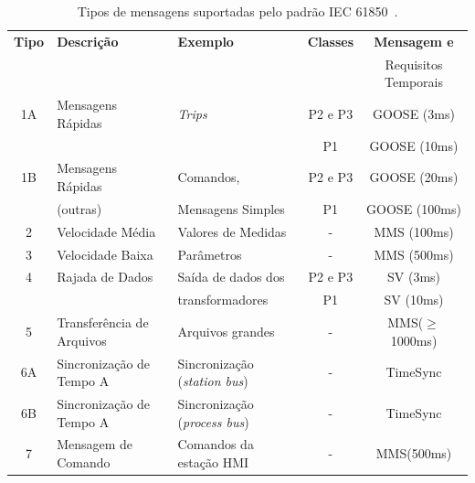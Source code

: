 \begin{table}[h!]	
	\begin{center}
		\caption{Tipos de mensagens suportadas pelo padrão IEC 61850~\cite{fangxing2010}.}	
		\begin{tabular}{|c|p{3.5cm}|p{4cm} |c|c|} \hline
		\label{tab:2_tabmsg}
{\bf Tipo} & {\bf Descrição} & {\bf Exemplo} & {\bf Classes} & {\bf Mensagem e }	\\
		   &			  &				  &	& Requisitos Temporais \\ \hline
		\hline
        1A & Mensagens Rápidas 				& {\it Trips} 					& P2 e P3 & GOOSE (3ms)		\\ \cline{4-5}
           &  				 				& 								& P1 	  & GOOSE (10ms)	\\ \hline 
        1B & Mensagens Rápidas 			 	& Comandos, 					& P2 e P3 & GOOSE (20ms)  	\\ \cline{4-5}
           & (outras)					 	& Mensagens Simples 			& P1	  & GOOSE (100ms) 	\\ \hline
         2 & Velocidade Média 				& Valores de Medidas 			& -  & MMS (100ms)			\\ \hline
         3 & Velocidade Baixa 				& Parâmetros 					& -  & MMS (500ms)			\\ \hline
         4 & Rajada de Dados                & Saída de dados dos 			& P2 e P3 & SV (3ms) 		\\ \cline{4-5}
		       &							&  transformadores				& P1      & SV (10ms)		\\ \hline
         5 & Transferência de Arquivos		& Arquivos grandes 				& -  & MMS($\geq$1000ms)	\\ \hline
        6A & Sincronização de Tempo A 		& Sincronização (\textit{station bus}) 		& -  & TimeSync	\\  \hline
        6B & Sincronização de Tempo A 		& Sincronização (\textit{process bus}) 		& -  & TimeSync \\ \hline
        7 & Mensagem de Comando 			& Comandos da estação HMI 		& -  & MMS(500ms)			\\ \hline
		\end{tabular}
	\end{center}
\end{table}

